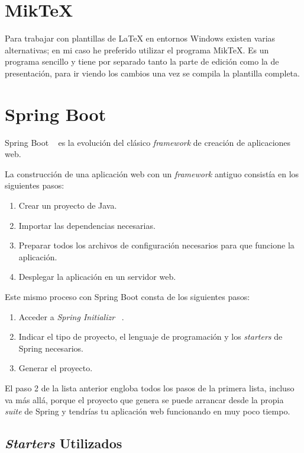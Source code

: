 \section{Mik\TeX{}}
Para trabajar con plantillas de \LaTeX{} en entornos Windows existen varias alternativas; en mi caso he preferido utilizar el programa Mik\TeX{}.
Es un programa sencillo y tiene por separado tanto la parte de edición como la de presentación, para ir viendo los cambios una vez se compila la plantilla completa.

\section{Spring Boot}

Spring Boot ~\cite{web:springbootArch} es la evolución del clásico \textit{framework} de creación de aplicaciones web.

La construcción de una aplicación web con un \textit{framework} antiguo consistía en los siguientes pasos:

\begin{enumerate}
	\item Crear un proyecto de Java.
	\item Importar las dependencias necesarias.
	\item Preparar todos los archivos de configuración necesarios para que funcione la aplicación.
	\item Desplegar la aplicación en un servidor web.
\end{enumerate}

Este mismo proceso con Spring Boot consta de los siguientes pasos:

\begin{enumerate}
	\item Acceder a \textit{Spring Initializr} ~\cite{web:springinitializr}.
	\item Indicar el tipo de proyecto, el lenguaje de programación y los \textit{starters} \cite{web:springStarters} de Spring necesarios.
	\item Generar el proyecto.
\end{enumerate}

El paso 2 de la lista anterior engloba todos los pasos de la primera lista, incluso va más allá, porque el proyecto que genera se puede arrancar desde la propia \textit{suite} de Spring y tendrías tu aplicación web funcionando en muy poco tiempo.

\subsection{\textit{Starters} Utilizados}

